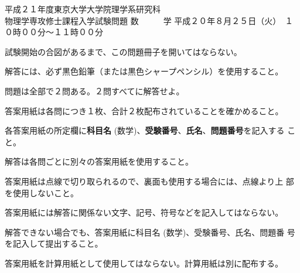 \begin{inshicover}%
  {平成２１年度東京大学大学院理学系研究科\\物理学専攻修士課程入学試験問題}%
  {数　　　学}%
  {平成２０年８月２５日（火）　１０時００分〜１１時００分}
\item 試験開始の合図があるまで、この問題冊子を開いてはならない。
\item 解答には、必ず黒色鉛筆（または黒色シャープペンシル）を使用すること。
\item 問題は全部で２問ある。２問すべてに解答せよ。
\item 答案用紙は各問につき１枚、合計２枚配布されていることを確かめること。
\item 各答案用紙の所定欄に{\bf 科目名} (数学)、{\bf 受験番号}、{\bf 氏名}、{\bf 問題番号}を記入する
      こと。
\item 解答は各問ごとに別々の答案用紙を使用すること。
\item 答案用紙は点線で切り取られるので、裏面も使用する場合には、点線より上
      部を使用しないこと。
\item 答案用紙には解答に関係ない文字、記号、符号などを記入してはならない。
\item 解答できない場合でも、答案用紙に科目名 (数学)、受験番号、氏名、問題番
      号を記入して提出すること。
\item 答案用紙を計算用紙として使用してはならない。計算用紙は別に配布する。
\end{inshicover}
